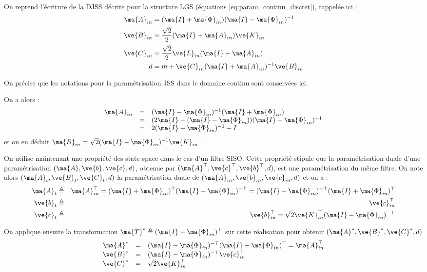 On reprend l'écriture de la DJSS décrite pour la structure LGS (équations \eqref{eq:param_continu_discret}), rappelée ici :
\begin{subequations}
	\begin{align}
		\ma{A}_{in}&=(\ma{I}+\ma{\Phi}_{in})(\ma{I}-\ma{\Phi}_{in})^{-1}\label{eq:A_in}\\
		\ve{B}_{in}&=\frac{\sqrt{2}}{2}(\ma{I}+\ma{A}_{in})\ve{K}_{in}\\
		\ve{C}_{in}&=\frac{\sqrt{2}}{2}\ve{L}_{in}(\ma{I}+\ma{A}_{in})\\
		d&=m+\ve{C}_{in}(\ma{I}+\ma{A}_{in})^{-1}\ve{B}_{in}
	\end{align}
	\label{eq:param_continu_discret_LCW}
\end{subequations}

On précise que les notations pour la paramétrisation JSS dans le domaine continu sont conservées ici.

On a alors :
\begin{equation*}
	\begin{array}{ccl}
		\ma{A}_{in} &=& (\ma{I}-\ma{\Phi}_{in})^{-1}(\ma{I}+\ma{\Phi}_{in})\\
		&=& (2\ma{I}-(\ma{I}-\ma{\Phi}_{in}))(\ma{I}-\ma{\Phi}_{in})^{-1}\\
		 &=&2(\ma{I}-\ma{\Phi}_{in})^{-1}-I
	\end{array}
\end{equation*}
et on en déduit $ \ma{B}_{in}=\sqrt{2}(\ma{I}-\ma{\Phi}_{in})^{-1}\ve{K}_{in}$.

On utilise maintenant une propriété des state-space dans le cas d'un filtre SISO. Cette propriété stipule que la paramétrisation duale d'une paramétrisation $(\ma{A},\ve{b},\ve{c},d)$, obtenue par $(\ma{A}^{\top},\ve{c}^{\top},\ve{b}^{\top},d)$, est une paramétrisation du même filtre. On note alors $(\ma{A}_t,\ve{B}_t,\ve{C}_t,d)$ la paramétrisation duale de $(\ma{A}_{in},\ve{b}_{in},\ve{c}_{in},d)$ et on a :
\begin{eqnarray}
	\ma{A}_t&\triangleq&\ma{A}_{in}^{\top} = (\ma{I}+\ma{\Phi}_{in})^{\top}(\ma{I}-\ma{\Phi}_{in})^{-\top} = (\ma{I}-\ma{\Phi}_{in})^{-\top}(\ma{I}+\ma{\Phi}_{in})^{\top}\\
	\ve{b}_t &\triangleq& \ve{c}_{in}^{\top}\\
	\ve{c}_t &\triangleq& \ve{b}_{in}^{\top}=\sqrt{2}\ve{K}_{in}^{\top}(\ma{I}-\ma{\Phi}_{in})^{-\top}
\end{eqnarray}

On applique ensuite la transformation $\ma{T}^*\triangleq(\ma{I}-\ma{\Phi}_{in})^{\top}$ sur cette réalisation pour obtenir $(\ma{A}^*,\ve{B}^*,\ve{C}^*,d)$
\begin{equation*}
\begin{array}{ccl}
\ma{A}^*&=&(\ma{I}-\ma{\Phi}_{in})^{-\top}(\ma{I}+\ma{\Phi}_{in})^{\top} = \ma{A}_{in}^{\top}\\
\ve{B}^* &=& (\ma{I}-\ma{\Phi}_{in})^{-\top}\ve{c}_{in}^{\top}\\
\ve{C}^* &=& \sqrt{2}\ve{K}_{in}^{\top}\\
\end{array}
\end{equation*}

